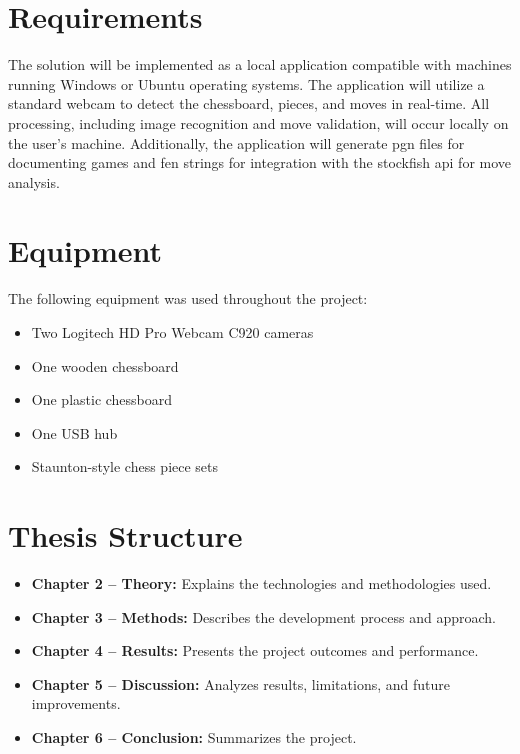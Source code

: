 \section{Requirements}

The solution will be implemented as a local application compatible with machines running Windows or Ubuntu operating systems. The application will utilize a standard webcam to detect the chessboard, pieces, and moves in real-time. All processing, including image recognition and move validation, will occur locally on the user's machine. Additionally, the application will generate \gls{pgn} files for documenting games and \gls{fen} strings for integration with the \gls{stockfish} \gls{api} for move analysis.

\section{Equipment}
The following equipment was used throughout the project:

\begin{itemize}
    \item Two Logitech HD Pro Webcam C920 cameras
    \item One wooden chessboard
    \item One plastic chessboard
    \item One USB hub
    \item Staunton-style chess piece sets
\end{itemize}


\section{Thesis Structure}

\begin{itemize}
    
    \item \textbf{Chapter 2 -- Theory:} Explains the technologies and methodologies used.
    
    \item \textbf{Chapter 3 -- Methods:} Describes the development process and approach.
    
    \item \textbf{Chapter 4 -- Results:} Presents the project outcomes and performance.
    
    \item \textbf{Chapter 5 -- Discussion:} Analyzes results, limitations, and future improvements.
    
    \item \textbf{Chapter 6 -- Conclusion:} Summarizes the project.
\end{itemize}